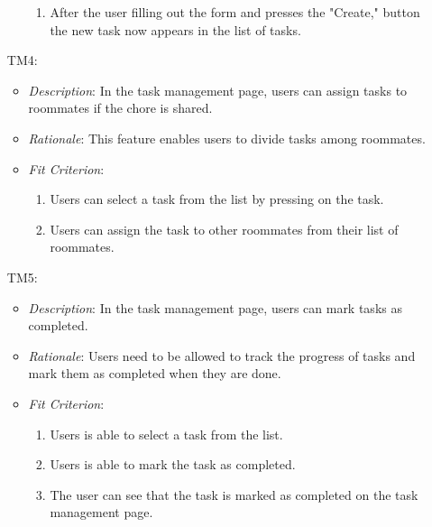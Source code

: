 \documentclass[12pt]{article}
\begin{document}
\begin{itemize}
\begin{itemize}
\begin{enumerate}
        \item After the user filling out the form and presses the "Create," button the new task now appears in the list of tasks.
    \end{enumerate}
    \end{itemize}
    \item[TM4:]
    \begin{itemize}
    \item \textit{Description}: In the task management page, users can assign tasks to roommates if the chore is shared.
    \item \textit{Rationale}: This feature enables users to divide tasks among roommates.
    \item \textit{Fit Criterion}: 
    \begin{enumerate}
        \item Users can select a task from the list by pressing on the task.
        \item Users can assign the task to other roommates from their list of roommates.
    \end{enumerate}
    \end{itemize}
    \item[TM5:]
    \begin{itemize}
    \item \textit{Description}: In the task management page, users can mark tasks as completed.
    \item \textit{Rationale}: Users need to be allowed to track the progress of tasks and mark them as completed when they are done.
    \item \textit{Fit Criterion}: 
    \begin{enumerate}
        \item Users is able to select a task from the list.
        \item Users is able to mark the task as completed.
        \item The user can see that the task is marked as completed on the task management page.
    \end{enumerate}
    \end{itemize}
    
\end{itemize}
\end{document}
